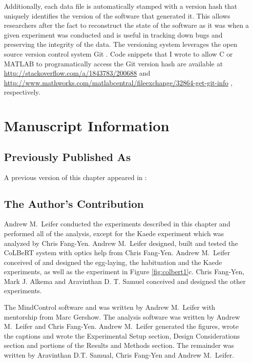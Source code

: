 Additionally, each data file is automatically stamped with a version hash that uniquely identifies the version of the software that generated it. This allows researchers after the fact to reconstruct the state of the software as it was when a given experiment was conducted and is useful in tracking down bugs and preserving the integrity of the data.  The versioning system leverages the open source version control system Git \citep{loeliger_version_2009}. Code snippets that I wrote to allow C or MATLAB to programatically access the Git version hash are available at \url{http://stackoverflow.com/a/1843783/200688} and \url{http://www.mathworks.com/matlabcentral/fileexchange/32864-get-git-info} , respectively. 




\section{Manuscript Information}
\subsection{Previously Published As}
A previous version of this chapter appeared in \citep{leifer_optogenetic_2011}:


\subsection{The Author's Contribution}
Andrew M.~Leifer conducted the experiments described in this chapter and performed all of the analysis, except for the Kaede experiment which was analyzed by Chris Fang-Yen. Andrew M.~Leifer designed, built and tested the CoLBeRT system with optics help from Chris Fang-Yen.  Andrew M.~Leifer conceived of and designed the egg-laying, the habituation and the Kaede experiments, as well as the experiment in Figure \ref{fig:colbert1}c.    Chris Fang-Yen, Mark J. Alkema and Aravinthan D. T. Samuel conceived and designed the other experiments. 

The MindControl software and was written by Andrew M.~Leifer with mentorship from Marc Gershow. The analysis software was written by Andrew M.~Leifer and Chris Fang-Yen. Andrew M.~Leifer generated the figures, wrote the captions and wrote the Experimental Setup section, Design Considerations section and  portions of the Results and  Methods section.  The remainder was written by Aravinthan D.T. Samual, Chris Fang-Yen and Andrew M.~Leifer.  
